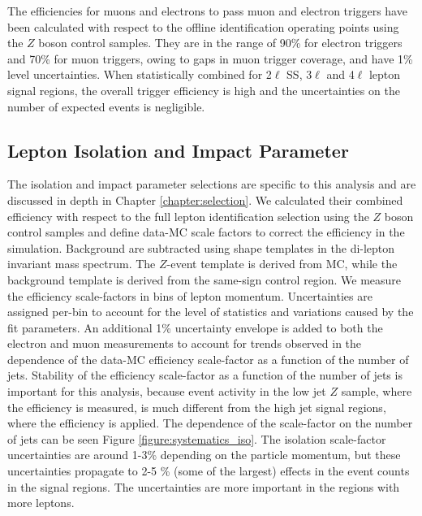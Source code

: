 The efficiencies for muons and electrons to pass muon\cite{ATLAS-CONF-2012-099} and electron triggers\cite{ATLAS-CONF-2012-048} have been calculated with respect to the offline identification operating points using the $Z$ boson control samples. They are in the range of 90\% for electron triggers and 70\% for muon triggers, owing to gaps in muon trigger coverage, and have 1\% level uncertainties. When statistically combined for 2$\ell$ SS, 3$\ell$ and 4$\ell$ lepton signal regions, the overall trigger efficiency is high and the uncertainties on the number of expected events is negligible. 


\subsection{Lepton Isolation and Impact Parameter}

The isolation and impact parameter selections are specific to this analysis and are discussed in depth in Chapter \ref{chapter:selection}. We calculated their combined efficiency with respect to the full lepton identification selection using the $Z$ boson control samples and define data-MC scale factors to correct the efficiency in the simulation. Background are subtracted using shape templates in the di-lepton invariant mass spectrum. The $Z$-event template is derived from MC, while the background template is derived from the same-sign control region. We measure the efficiency scale-factors in bins of lepton momentum. Uncertainties are assigned per-bin to account for the level of statistics and variations caused by the fit parameters. An additional 1\% uncertainty envelope is added to both the electron and muon measurements to account for trends observed in the dependence of the data-MC efficiency scale-factor as a function of the number of jets. Stability of the efficiency scale-factor as a function of the number of jets is important for this analysis, because event activity in the low jet $Z$ sample, where the efficiency is measured, is much different from the high jet signal regions, where the efficiency is applied. The dependence of the scale-factor on the number of jets can be seen Figure \ref{figure:systematics_iso}. The isolation scale-factor uncertainties are around 1-3\% depending on the particle momentum, but these uncertainties propagate to 2-5 \% (some of the largest) effects in the event counts in the signal regions. The uncertainties are more important in the regions with more leptons. 


